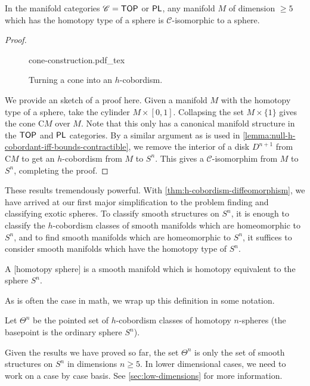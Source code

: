 \begin{corollary}\label{thm:generalized-poincare-smale}
	In the manifold categories $\mathscr{C}=\mathsf{TOP}$ or $\mathsf{PL}$, any manifold $M$ of dimension $\geq 5$ which has the homotopy type of a sphere is $\mathscr{C}$-isomorphic to a sphere.	
\end{corollary}
\begin{proof}
	\begin{figure}[ht]
		\centering
		{cone-construction.pdf_tex}
		\caption{Turning a cone into an $h$-cobordism.}
	\end{figure}

	We provide an sketch of a proof here. Given a manifold $M$ with the homotopy type of a sphere, take the cylinder $M\times [0,1]$. Collapsing the set $M\times \{1\}$ gives the cone $\mathrm{C}M$ over $M$. Note that this only has a canonical manifold structure in the $\mathsf{TOP}$ and $\mathsf{PL}$ categories. By a similar argument as is used in \cref{lemma:null-h-cobordant-iff-bounds-contractible}, we remove the interior of a disk $D^{n+1}$ from $\mathrm{C}M$ to get an $h$-cobordism from $M$ to $S^{n}$. This gives a $\mathscr{C}$-isomorphim from $M$ to $S^n$, completing the proof.
\end{proof}

These results tremendously powerful. With \cref{thm:h-cobordism-diffeomorphism}, we have arrived at our first major simplification to the problem finding and classifying exotic spheres. To classify smooth structures on $S^n$, it is enough to classify the $h$-cobordism classes of smooth manifolds which are homeomorphic to $S^n$, and to find smooth manifolds which are homeomorphic to $S^n$, it suffices to consider smooth manifolds which have the homotopy type of $S^n$.

\begin{definition}
	A [homotopy sphere] is a smooth manifold which is homotopy equivalent to the sphere $S^n$.
\end{definition}

As is often the case in math, we wrap up this definition in some notation.

\begin{definition}
	Let $\Theta^n$ be the pointed set of $h$-cobordism classes of homotopy $n$-spheres (the basepoint is the ordinary sphere $S^n$).
\end{definition}

\begin{remark*}
	Given the results we have proved so far, the set $\Theta^n$ is only the set of smooth structures on $S^n$ in dimensions $n\geq 5$. In lower dimensional cases, we need to work on a case by case basis. See \cref{sec:low-dimensions} for more information.
\end{remark*}

\smallrule


